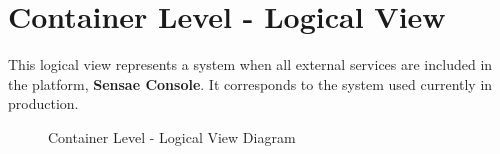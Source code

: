 \chapter{Container Level - Logical View}
\label{AppendixB}

This logical view represents a system when all external services are included in the platform, \textbf{Sensae Console}. It corresponds to the system used currently in production.

\begin{sidewaysfigure}
   \centering
   \resizebox{0.8\columnwidth}{!}
   {
      
   }
   \caption[Container Level - Logical View Diagram]{Container Level - Logical View Diagram}
   \label{fig:AppendixB:complete}
\end{sidewaysfigure}
